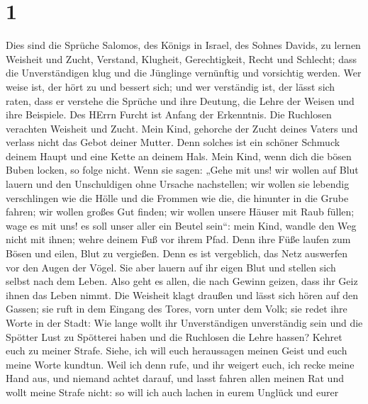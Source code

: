 \hypertarget{section}{%
\section{1}\label{section}}

 Dies sind die Sprüche Salomos, des Königs in Israel, des
Sohnes Davids,  zu lernen Weisheit und Zucht, Verstand,
 Klugheit, Gerechtigkeit, Recht und Schlecht; 
dass die Unverständigen klug und die Jünglinge vernünftig und vorsichtig
werden.  Wer weise ist, der hört zu und bessert sich; und
wer verständig ist, der lässt sich raten,  dass er verstehe
die Sprüche und ihre Deutung, die Lehre der Weisen und ihre Beispiele.
 Des HErrn Furcht ist Anfang der Erkenntnis. Die Ruchlosen
verachten Weisheit und Zucht.  Mein Kind, gehorche der Zucht
deines Vaters und verlass nicht das Gebot deiner Mutter. 
Denn solches ist ein schöner Schmuck deinem Haupt und eine Kette an
deinem Hals.  Mein Kind, wenn dich die bösen Buben locken,
so folge nicht.  Wenn sie sagen: „Gehe mit uns! wir wollen
auf Blut lauern und den Unschuldigen ohne Ursache nachstellen;
 wir wollen sie lebendig verschlingen wie die Hölle und die
Frommen wie die, die hinunter in die Grube fahren;  wir
wollen großes Gut finden; wir wollen unsere Häuser mit Raub füllen;
 wage es mit uns! es soll unser aller ein Beutel sein``:
 mein Kind, wandle den Weg nicht mit ihnen; wehre deinem
Fuß vor ihrem Pfad.  Denn ihre Füße laufen zum Bösen und
eilen, Blut zu vergießen.  Denn es ist vergeblich, das Netz
auswerfen vor den Augen der Vögel.  Sie aber lauern auf ihr
eigen Blut und stellen sich selbst nach dem Leben.  Also
geht es allen, die nach Gewinn geizen, dass ihr Geiz ihnen das Leben
nimmt.  Die Weisheit klagt draußen und lässt sich hören auf
den Gassen;  sie ruft in dem Eingang des Tores, vorn unter
dem Volk; sie redet ihre Worte in der Stadt:  Wie lange
wollt ihr Unverständigen unverständig sein und die Spötter Lust zu
Spötterei haben und die Ruchlosen die Lehre hassen?  Kehret
euch zu meiner Strafe. Siehe, ich will euch heraussagen meinen Geist und
euch meine Worte kundtun.  Weil ich denn rufe, und ihr
weigert euch, ich recke meine Hand aus, und niemand achtet darauf,
 und lasst fahren allen meinen Rat und wollt meine Strafe
nicht:  so will ich auch lachen in eurem Unglück und eurer
